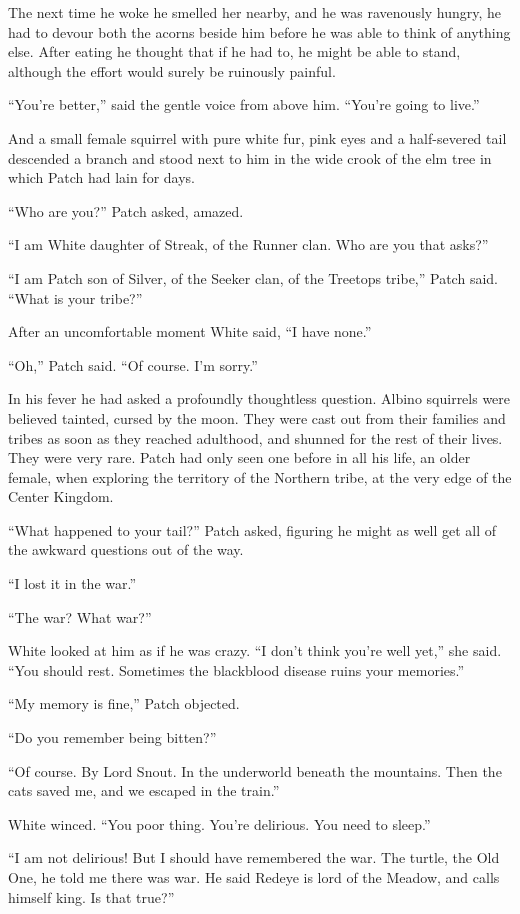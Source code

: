 \documentclass[ebook,oneside,openany,12pt]{memoir}
\begin{document}
The next time he woke he smelled her nearby, and he was ravenously
hungry, he had to devour both the acorns beside him before he was able
to think of anything else. After eating he thought that if he had to,
he might be able to stand, although the effort would surely be
ruinously painful.

“You’re better,” said the gentle voice from above him. “You’re going
to live.”

And a small female squirrel with pure white fur, pink eyes and a
half-severed tail descended a branch and stood next to him in the wide
crook of the elm tree in which Patch had lain for days.

“Who are you?” Patch asked, amazed.

“I am White daughter of Streak, of the Runner clan. Who are you that
asks?”

“I am Patch son of Silver, of the Seeker clan, of the Treetops tribe,”
Patch said. “What is your tribe?”

After an uncomfortable moment White said, “I have none.”

“Oh,” Patch said. “Of course. I’m sorry.”

In his fever he had asked a profoundly thoughtless question. Albino
squirrels were believed tainted, cursed by the moon. They were cast
out from their families and tribes as soon as they reached adulthood,
and shunned for the rest of their lives. They were very rare. Patch
had only seen one before in all his life, an older female, when
exploring the territory of the Northern tribe, at the very edge of the
Center Kingdom.

“What happened to your tail?” Patch asked, figuring he might as well
get all of the awkward questions out of the way.

“I lost it in the war.”

“The war? What war?”

White looked at him as if he was crazy. “I don’t think you’re well
yet,” she said. “You should rest. Sometimes the blackblood disease
ruins your memories.”

“My memory is fine,” Patch objected.

“Do you remember being bitten?”

“Of course. By Lord Snout. In the underworld beneath the
mountains. Then the cats saved me, and we escaped in the train.”

White winced. “You poor thing. You’re delirious. You need to sleep.”

“I am not delirious! But I should have remembered the war. The turtle,
the Old One, he told me there was war. He said Redeye is lord of the
Meadow, and calls himself king. Is that true?”
\end{document}
